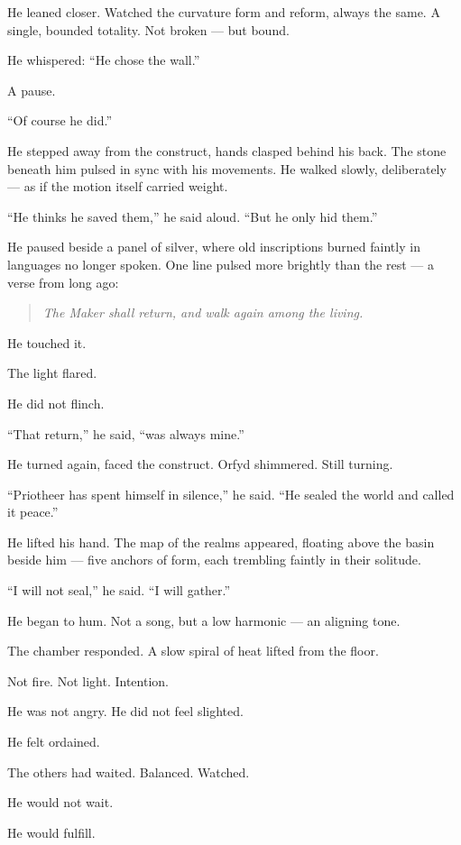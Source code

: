 \documentclass[9pt]{article}
\begin{document}
He leaned closer. Watched the curvature form and reform, always the same. A single, bounded totality. Not broken — but bound.

He whispered: ``He chose the wall.''

A pause.

``Of course he did.''

He stepped away from the construct, hands clasped behind his back. The stone beneath him pulsed in sync with his movements. He walked slowly, deliberately — as if the motion itself carried weight.

``He thinks he saved them,'' he said aloud. ``But he only hid them.''

He paused beside a panel of silver, where old inscriptions burned faintly in languages no longer spoken. One line pulsed more brightly than the rest — a verse from long ago:

\begin{quote}
\emph{The Maker shall return, and walk again among the living.}
\end{quote}

He touched it.

The light flared.

He did not flinch.

``That return,'' he said, ``was always mine.''

He turned again, faced the construct. Orfyd shimmered. Still turning.

``Priotheer has spent himself in silence,'' he said. ``He sealed the world and called it peace.''

He lifted his hand. The map of the realms appeared, floating above the basin beside him — five anchors of form, each trembling faintly in their solitude.

``I will not seal,'' he said. ``I will gather.''

He began to hum. Not a song, but a low harmonic — an aligning tone.

The chamber responded. A slow spiral of heat lifted from the floor.

Not fire. Not light. Intention.

He was not angry. He did not feel slighted.

He felt ordained.

The others had waited. Balanced. Watched.

He would not wait.

He would fulfill.


\newpage
\end{document}
